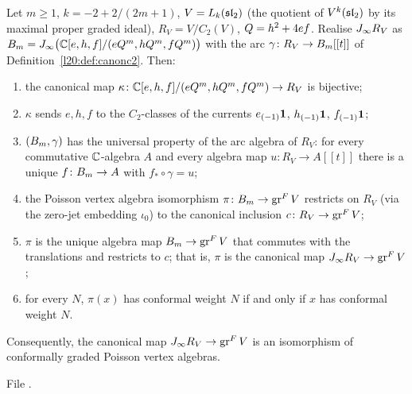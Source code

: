 \begin{theorem}\label{l20:thm:ad11}
Let $m\ge1$, $k=-2+2/(2m+1)$, $V=L_k(\mathfrak{sl}_2)$ (the quotient of $V^k(\mathfrak{sl}_2)$ by its maximal proper graded ideal),
$R_V=V/C_2(V)$, $Q=h^2+4ef$. Realise $J_\infty R_V$ as $B_m=J_\infty\bigl({\mathbb{C}}[e,h,f]/(eQ^m,hQ^m,
fQ^m)\bigr)$ with the arc $\gamma\colon R_V\to B_m[[t]]$ of Definition~\ref{l20:def:canonc2}. Then:
\begin{enumerate}
\item the canonical map $\kappa\colon{\mathbb{C}}[e,h,f]/(eQ^m,hQ^m,fQ^m)\to R_V$ is bijective;
\item $\kappa$ sends $e,h,f$ to the $C_2$-classes of the currents $e_{(-1)}\mathbf{1}$, $h_{(-1)}\mathbf{1}$, $f_{(-1)}\mathbf{1}$;
\item $(B_m,\gamma)$ has the universal property of the arc algebra of $R_V$: for every commutative ${\mathbb{C}}$-algebra $A$ and
  every algebra map $u\colon R_V\to A[[t]]$ there is a unique $f\colon B_m\to A$ with $f_*\circ\gamma=u$;
\item the Poisson vertex algebra isomorphism $\pi\colon B_m\to\operatorname{gr}^F V$ restricts on $R_V$ (via the zero-jet
  embedding $\iota_0$) to the canonical inclusion $c\colon R_V\to\operatorname{gr}^F V$;
\item $\pi$ is the unique algebra map $B_m\to\operatorname{gr}^F V$ that commutes with the translations and restricts to $c$; that is,
  $\pi$ is the canonical map $J_\infty R_V\to\operatorname{gr}^F V$;
\item for every $N$, $\pi(x)$ has conformal weight $N$ if and only if $x$ has conformal weight $N$.
\end{enumerate}
Consequently, the canonical map $J_\infty R_V\to\operatorname{gr}^F V$ is an isomorphism of conformally graded Poisson vertex algebras.
\end{theorem}
\noindent File .
